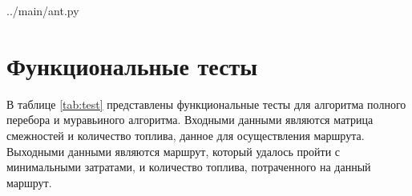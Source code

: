 \noindent
\begin{minipage}{\linewidth}
\begin{lstinputlisting}[
	caption={Алгоритм обновления матрицы феромонов},
	label={lst:pher},
	linerange={40-57}
]{../main/ant.py}
\end{lstinputlisting}
\end{minipage}

\clearpage

\section{Функциональные тесты}
В таблице \ref{tab:test} представлены функциональные тесты для алгоритма полного перебора
и муравьиного алгоритма.
Входными данными являются матрица смежностей и количество топлива, данное для осуществления маршрута. 
Выходными данными являются маршрут, который удалось пройти с минимальными затратами, и количество топлива, потраченного на данный маршрут.
